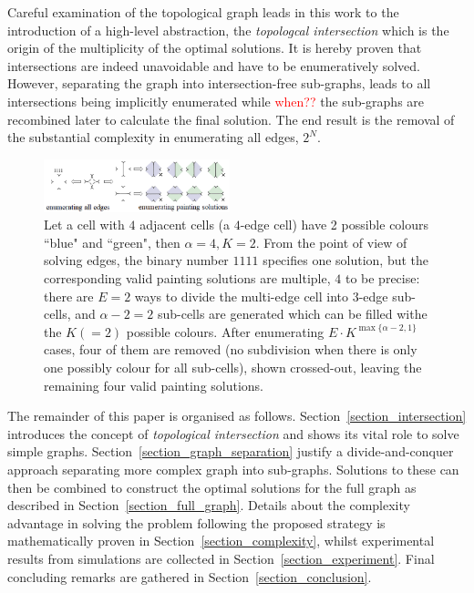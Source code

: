 \documentclass[conference]{IEEEtran}
\begin{document}
Careful examination of the topological graph leads in this work to the introduction of a high-level abstraction, the \textit{topologcal  intersection} which is the origin of the multiplicity of the optimal solutions. It is hereby proven that intersections are indeed unavoidable and have to be enumeratively solved. However, separating the graph into intersection-free sub-graphs, leads to all intersections being implicitly enumerated while \textcolor{red}{when??} the sub-graphs are recombined later to calculate the final solution. The end result is the removal of the substantial complexity in enumerating all edges, $2^N$. 


\begin{figure}[t]
\centering
\includegraphics[width = 0.48\textwidth]{figures/many_to_one_2}
\caption{Let a cell with $4$ adjacent cells (a $4$-edge cell) have 2 possible colours ``blue" and ``green", then $\alpha = 4, K = 2$. From the point of view of solving edges, the binary number $1111$ specifies one solution, but the corresponding valid painting solutions are multiple, $4$ to be precise: there are $E=2$ ways to divide the multi-edge cell into $3$-edge sub-cells, and $\alpha-2 = 2$ sub-cells are generated which can be filled withe the $K (=2)$ possible colours. After enumerating $E\cdot K^{\max\{\alpha-2, 1\}}$ cases, four of them are removed (no subdivision when there is only one possibly colour for all sub-cells), shown crossed-out, leaving the remaining four valid painting solutions.}
\label{fig:many_to_one}
\end{figure}

The remainder of this paper is organised as follows. Section~\ref{section_intersection} introduces the concept of \textit{topological intersection} and shows its vital role to solve simple graphs. Section~\ref{section_graph_separation} justify a divide-and-conquer approach separating more complex graph into sub-graphs. Solutions to these can then be combined to construct the optimal solutions for the full graph as described in Section~\ref{section_full_graph}. Details  about the complexity advantage in solving the problem following the proposed strategy is mathematically proven in Section~\ref{section_complexity}, whilst experimental results from simulations are collected in Section~\ref{section_experiment}. Final concluding remarks are gathered in Section~\ref{section_conclusion}.
\end{document}
